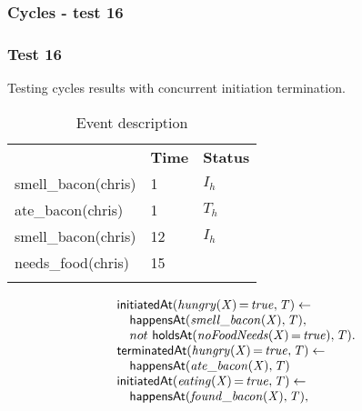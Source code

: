 \documentclass[8pt]{beamer}
\DeclareMathOperator{\val}{=}  %
\def \patsize {}
\def\happensAt{\textsf{\patsize happensAt}}
\def\holdsAt{\textsf{\patsize holdsAt}}
\def\initiatedAt{\textsf{\patsize initiatedAt}}
\def\terminatedAt{\textsf{\patsize terminatedAt}}
\newenvironment{mysplit}%
  {\arraycolsep 0pt \begin{array}{l}}%
  {\end{array}}
\begin{document}
\begin{frame}
    \frametitle{Cycles - test 16}
    \subsubsection{Test 16}
    \small
    Testing cycles results with concurrent initiation termination.\linebreak
    \begin{minipage}{0.4\linewidth}
        \begin{table}[t!]
            \caption{Event description}
            \begin{center}

                \begin{tabular}{lll}
                    \hline\noalign{\smallskip}
                    \multicolumn{1}{l}{\textbf{Event}} & \multicolumn{1}{c}{\textbf{Time}} & \multicolumn{1}{c}{\textbf{Status}} \\
                    smell\_bacon(chris)& 1 & $I_{h}$\\
                    ate\_bacon(chris)& 1  & $T_{h}$\\
                    smell\_bacon(chris)& 12 & $I_{h}$\\
                    needs\_food(chris)& 15 & \\
                    \noalign{\smallskip}
                    \hline
                \end{tabular}
            \end{center}
        \end{table}
    \end{minipage}
    \begin{minipage}{0.55\linewidth}
        \begin{align*}
            \begin{mysplit}
                \initiatedAt\mathit{(hungry(X)\val true,T)\leftarrow}\\
                \quad    \happensAt\mathit{(smell\_bacon(X),T),}\\
                \quad    not\ \holdsAt\mathit{(noFoodNeeds(X)\val true),T).}\\
                \terminatedAt\mathit{(hungry(X)\val true,T)\leftarrow}\\
                \quad    \happensAt\mathit{(ate\_bacon(X),T)}\\
                \initiatedAt\mathit{(eating(X)\val true,T)\leftarrow}\\
                \quad    \happensAt\mathit{(found\_bacon(X),T),}\\

\end{mysplit}
\end{align*}
\end{minipage}
\end{frame}
\end{document}
